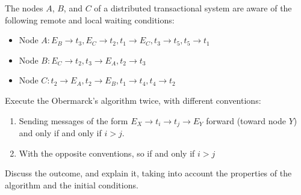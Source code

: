 \documentclass[12pt, a4paper]{report}
\newtheorem[style=M,bodystyle=\normalfont]{theorem}{Theorem}
\newtheorem[style=M,bodystyle=\normalfont]{corollary}{Corollary}
\newtheorem[style=M,bodystyle=\normalfont]{lemma}{Lemma}
\newtheorem[style=M,bodystyle=\normalfont]{definition}{Definition}
\begin{document}
\begin{Exercise}[label=14]
    The nodes $A$, $B$, and $C$ of a distributed transactional system are aware of the following remote and local waiting conditions:
    \begin{itemize}
        \item Node $A: E_B \rightarrow t_3, E_C \rightarrow t_2, t_1 \rightarrow E_C, t_3 \rightarrow t_5, t_5 \rightarrow t_1$
        \item Node $B: E_C \rightarrow t_2, t_3 \rightarrow E_A, t_2 \rightarrow t_3$
        \item Node $C: t_2 \rightarrow E_A, t_2 \rightarrow E_B, t_1 \rightarrow t_4, t_4 \rightarrow t_2$
    \end{itemize}
    Execute the Obermarck's algorithm twice, with different conventions:
    \begin{enumerate}
        \item Sending messages of the form $E_X \rightarrow t_i \rightarrow t_j \rightarrow E_Y$ forward (toward node $Y$) and only 
            if and only if $i > j$. 
        \item With the opposite conventions, so if and only if $i > j$
    \end{enumerate}
    Discuss the outcome, and explain it, taking into account the properties of the algorithm and the initial conditions.
\end{Exercise}
\end{document}

